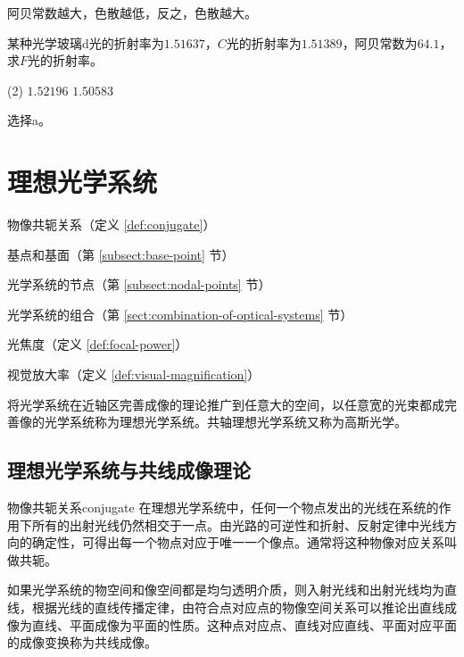 \documentclass[cn,10pt,chinesefont=founder,math=newtx,cite=super,twoside]{elegantbook}
\begin{document}
\begin{property}
	阿贝常数越大，色散越低，反之，色散越大。
\end{property}

\begin{problem}
	某种光学玻璃d光的折射率为$1.51637$，$C$光的折射率为$1.51389$，阿贝常数为$64.1$，求$F$光的折射率。
	\begin{tasks}(2)
		\task $1.52196$
		\task $1.50583$
	\end{tasks}
\end{problem}

\begin{solution}
	选择a。
\end{solution}

\chapter{理想光学系统}

\begin{introduction}
	\item 物像共轭关系（定义 \ref{def:conjugate}）
	\item 基点和基面（第 \ref{subsect:base-point} 节）
	\item 光学系统的节点（第 \ref{subsect:nodal-points} 节）
	\item 光学系统的组合（第 \ref{sect:combination-of-optical-systems} 节）
	\item 光焦度（定义 \ref{def:focal-power}）
	\item 视觉放大率（定义 \ref{def:visual-magnification}）
\end{introduction}

将光学系统在近轴区完善成像的理论推广到任意大的空间，以任意宽的光束都成完善像的光学系统称为理想光学系统。共轴理想光学系统又称为高斯光学。

\section{理想光学系统与共线成像理论}

\begin{definition}{物像共轭关系}{conjugate}
	在理想光学系统中，任何一个物点发出的光线在系统的作用下所有的出射光线仍然相交于一点。由光路的可逆性和折射、反射定律中光线方向的确定性，可得出每一个物点对应于唯一一个像点。通常将这种物像对应关系叫做共轭。
\end{definition}

如果光学系统的物空间和像空间都是均匀透明介质，则入射光线和出射光线均为直线，根据光线的直线传播定律，由符合点对应点的物像空间关系可以推论出直线成像为直线、平面成像为平面的性质。这种点对应点、直线对应直线、平面对应平面的成像变换称为共线成像。
\end{document}
